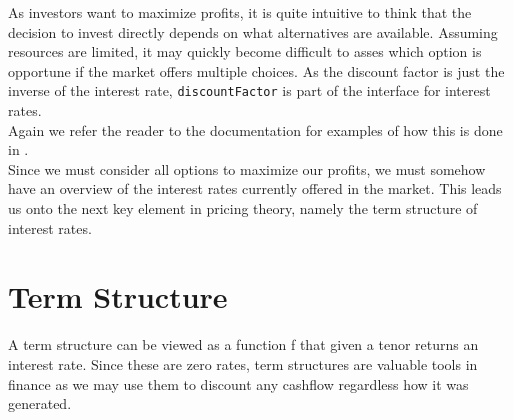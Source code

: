 As investors want to maximize profits, it is quite intuitive to think that
the decision to invest directly depends on what alternatives are available.
Assuming resources are limited, it may quickly become difficult to asses which
option is opportune if the market offers multiple choices. As the discount factor
is just the inverse of the interest rate, \texttt{discountFactor} is part of the
interface for interest rates.\\

Again we refer the reader to the documentation\cite{hqldoc} for examples of
how this is done in \hql.\\

Since we must consider all options to maximize our profits, we must somehow have an
overview of the interest rates currently offered in the market. This leads us onto the
next key element in pricing theory, namely the term structure of interest rates.

\section{Term Structure}

A term structure can be viewed as a function f that given a tenor returns 
an interest rate. Since these are zero rates, term structures are valuable 
tools in finance as we may use them to discount any cashflow regardless how it
was generated.



